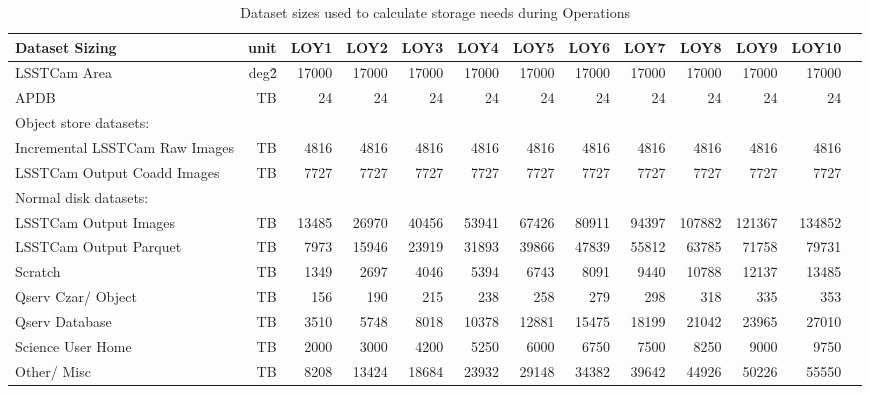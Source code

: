\tiny \begin{longtable} { |p{}  |r  |r  |r  |r  |r  |r  |r  |r  |r  |r  |r  |r |} 
\caption{Dataset sizes used to calculate storage needs during Operations \label{tab:datasetSizingOps}}\\ 
\hline 
\textbf{Dataset Sizing}&\textbf{unit}&\textbf{LOY1}&\textbf{LOY2}&\textbf{LOY3}&\textbf{LOY4}&\textbf{LOY5}&\textbf{LOY6}&\textbf{LOY7}&\textbf{LOY8}&\textbf{LOY9}&\textbf{LOY10} \\ \hline
{LSSTCam Area}&{deg\^2}&{17000}&{17000}&{17000}&{17000}&{17000}&{17000}&{17000}&{17000}&{17000}&{17000} \\ \hline
{APDB}&{TB}&{24}&{24}&{24}&{24}&{24}&{24}&{24}&{24}&{24}&{24} \\ \hline
{Object store datasets:}&&&&&&&&&&& \\ \hline
{Incremental LSSTCam Raw Images}&{TB}&{4816}&{4816}&{4816}&{4816}&{4816}&{4816}&{4816}&{4816}&{4816}&{4816} \\ \hline
{LSSTCam Output Coadd Images}&{TB}&{7727}&{7727}&{7727}&{7727}&{7727}&{7727}&{7727}&{7727}&{7727}&{7727} \\ \hline
{Normal disk datasets:}&&&&&&&&&&& \\ \hline
{LSSTCam Output Images}&{TB}&{13485}&{26970}&{40456}&{53941}&{67426}&{80911}&{94397}&{107882}&{121367}&{134852} \\ \hline
{LSSTCam Output Parquet}&{TB}&{7973}&{15946}&{23919}&{31893}&{39866}&{47839}&{55812}&{63785}&{71758}&{79731} \\ \hline
{Scratch}&{TB}&{1349}&{2697}&{4046}&{5394}&{6743}&{8091}&{9440}&{10788}&{12137}&{13485} \\ \hline
{Qserv Czar/ Object}&{TB}&{156}&{190}&{215}&{238}&{258}&{279}&{298}&{318}&{335}&{353} \\ \hline
{Qserv Database}&{TB}&{3510}&{5748}&{8018}&{10378}&{12881}&{15475}&{18199}&{21042}&{23965}&{27010} \\ \hline
{Science User Home}&{TB}&{2000}&{3000}&{4200}&{5250}&{6000}&{6750}&{7500}&{8250}&{9000}&{9750} \\ \hline
{Other/ Misc}&{TB}&{8208}&{13424}&{18684}&{23932}&{29148}&{34382}&{39642}&{44926}&{50226}&{55550} \\ \hline
\end{longtable} \normalsize
